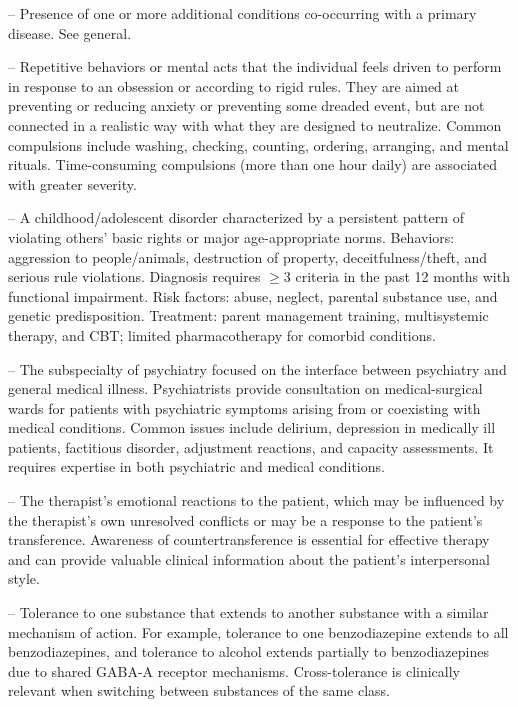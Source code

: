 -- Presence of one or more additional conditions co-occurring with a primary disease. See general.

-- Repetitive behaviors or mental acts that the individual feels driven to perform in response to an obsession or according to rigid rules. They are aimed at preventing or reducing anxiety or preventing some dreaded event, but are not connected in a realistic way with what they are designed to neutralize. Common compulsions include washing, checking, counting, ordering, arranging, and mental rituals. Time-consuming compulsions (more than one hour daily) are associated with greater severity.

-- A childhood/adolescent disorder characterized by a persistent pattern of violating others' basic rights or major age-appropriate norms. Behaviors: aggression to people/animals, destruction of property, deceitfulness/theft, and serious rule violations. Diagnosis requires \(\ge\)3 criteria in the past 12 months with functional impairment. Risk factors: abuse, neglect, parental substance use, and genetic predisposition. Treatment: parent management training, multisystemic therapy, and CBT; limited pharmacotherapy for comorbid conditions.

-- The subspecialty of psychiatry focused on the interface between psychiatry and general medical illness. Psychiatrists provide consultation on medical-surgical wards for patients with psychiatric symptoms arising from or coexisting with medical conditions. Common issues include delirium, depression in medically ill patients, factitious disorder, adjustment reactions, and capacity assessments. It requires expertise in both psychiatric and medical conditions.

-- The therapist's emotional reactions to the patient, which may be influenced by the therapist's own unresolved conflicts or may be a response to the patient's transference. Awareness of countertransference is essential for effective therapy and can provide valuable clinical information about the patient's interpersonal style.

-- Tolerance to one substance that extends to another substance with a similar mechanism of action. For example, tolerance to one benzodiazepine extends to all benzodiazepines, and tolerance to alcohol extends partially to benzodiazepines due to shared GABA-A receptor mechanisms. Cross-tolerance is clinically relevant when switching between substances of the same class.

